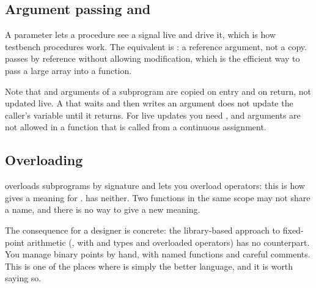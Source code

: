 \subsection{Argument passing and }

A \VHDL{}  parameter lets a procedure see a signal live and drive
it, which is how testbench procedures work. The \SV{} equivalent is : a
reference argument, not a copy.  passes by reference without
allowing modification, which is the efficient way to pass a large array into a
function.


Note that  and  arguments of a \SV{} subprogram are
copied on entry and on return, not updated live. A  that waits and
then writes an  argument does not update the caller's variable
until it returns. For live updates you need , and  arguments
are not allowed in a function that is called from a continuous assignment.

\subsection{Overloading}

\VHDL{} overloads subprograms by signature and lets you overload operators:
this is how  gives  a meaning for
. \SV{} has neither. Two functions in the same scope may not
share a name, and there is no way to give \code{+} a new meaning.

The consequence for a \VHDL{} designer is concrete: the library-based approach
to fixed-point arithmetic (, with  and
 types and overloaded operators) has no \SV{} counterpart. You
manage binary points by hand, with named functions and careful comments. This
is one of the places where \VHDL{} is simply the better language, and it is
worth saying so.

